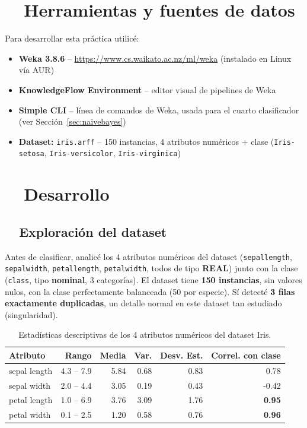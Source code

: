 \documentclass[11pt,a4paper]{article}
\begin{document}
\section{\faToolbox\ \ Herramientas y fuentes de datos}
Para desarrollar esta práctica utilicé:
\begin{itemize}[leftmargin=1.6em, itemsep=5pt]
  \raggedright
  \item[\textcolor{cCyan}{\faDesktop}] \textbf{Weka 3.8.6} -- \url{https://www.cs.waikato.ac.nz/ml/weka} (instalado en Linux vía AUR)
  \item[\textcolor{cCyan}{\faSitemap}] \textbf{KnowledgeFlow Environment} -- editor visual de pipelines de Weka
  \item[\textcolor{cCyan}{\faTerminal}] \textbf{Simple CLI} -- línea de comandos de Weka, usada para el cuarto clasificador (ver Sección~\ref{sec:naivebayes})
  \item[\textcolor{cCyan}{\faDatabase}] \textbf{Dataset:} \texttt{iris.arff} -- 150 instancias, 4 atributos numéricos + clase (\texttt{Iris-setosa}, \texttt{Iris-versicolor}, \texttt{Iris-virginica})
\end{itemize}

\section{\faCogs\ \ Desarrollo}

\subsection{\faSearch\ \ Exploración del dataset}
Antes de clasificar, analicé los 4 atributos numéricos del dataset (\texttt{sepallength}, \texttt{sepalwidth}, \texttt{petallength}, \texttt{petalwidth}, todos de tipo \textbf{REAL}) junto con la clase (\texttt{class}, tipo \textbf{nominal}, 3 categorías). El dataset tiene \textbf{150 instancias}, sin valores nulos, con la clase perfectamente balanceada (50 por especie). Sí detecté \textbf{3 filas exactamente duplicadas}, un detalle normal en este dataset tan estudiado (singularidad).

\begin{table}[H]
\centering
\small
\begin{tabular}{lrrrrr}
\toprule
\textbf{Atributo} & \textbf{Rango} & \textbf{Media} & \textbf{Var.} & \textbf{Desv. Est.} & \textbf{Correl. con clase} \\
\midrule
sepal length & 4.3 -- 7.9 & 5.84 & 0.68 & 0.83 & 0.78 \\
sepal width  & 2.0 -- 4.4 & 3.05 & 0.19 & 0.43 & -0.42 \\
petal length & 1.0 -- 6.9 & 3.76 & 3.09 & 1.76 & \textbf{0.95} \\
petal width  & 0.1 -- 2.5 & 1.20 & 0.58 & 0.76 & \textbf{0.96} \\
\bottomrule
\end{tabular}
\caption{Estadísticas descriptivas de los 4 atributos numéricos del dataset Iris.}
\end{table}
\end{document}
